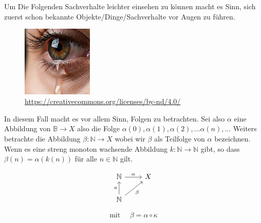 \chapter{}

Um Die Folgenden Sachverhalte leichter einsehen zu können macht es Sinn,
sich zuerst schon bekannte Objekte/Dinge/Sachverhalte vor Augen zu führen.
\begin{figure}[h!]
 \centering
    \includegraphics[width=0.3\textwidth]{pictures/Auge.jpeg}
    \caption{\url{https://creativecommons.org/licenses/by-nd/4.0/}}
 \end{figure}

In diesem Fall macht es vor allem Sinn, Folgen zu betrachten.
Sei also $\alpha$ eine Abbildung von $\mathbb{B} \to X$ 
also die Folge $\alpha(0), \alpha(1), \alpha(2), \dots \alpha(n), \dots $
Weiters betrachte die Abbildung $\beta: \mathbb{N} \to X$
wobei wir $\beta$ als Teilfolge von $\alpha$ bezeichnen. Wenn es eine streng
monoton wachsende Abbildung $k: \mathbb{N} \to \mathbb{N}$ gibt, so dass
$\beta(n) = \alpha(k(n))$ für alle $n \in \mathbb{N}$ gilt.

$$
\begin{tikzcd}
\mathbb{N} \arrow[r, "\alpha"]  & X \\
\mathbb{N} \arrow[ur, "\beta"'] \arrow["\kappa", u] &
\end{tikzcd}
$$

$$
\text{mit } \quad \beta = \alpha \circ \kappa
$$

